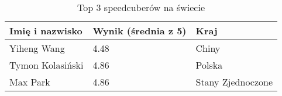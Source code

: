 \begin{table}[htbp]
\begin{tabular}{|l|l|l|}
\hline
\textbf{Imię i nazwisko} & \textbf{Wynik (średnia z 5)} & \textbf{Kraj}     \\ \hline
Yiheng Wang              & 4.48                         & Chiny             \\ \hline
Tymon Kolasiński         & 4.86                         & Polska            \\ \hline
Max Park                 & 4.86                         & Stany Zjednoczone \\ \hline
\end{tabular}
\label{tab:spc}
\caption{Top 3 speedcuberów na świecie}
\end{table}